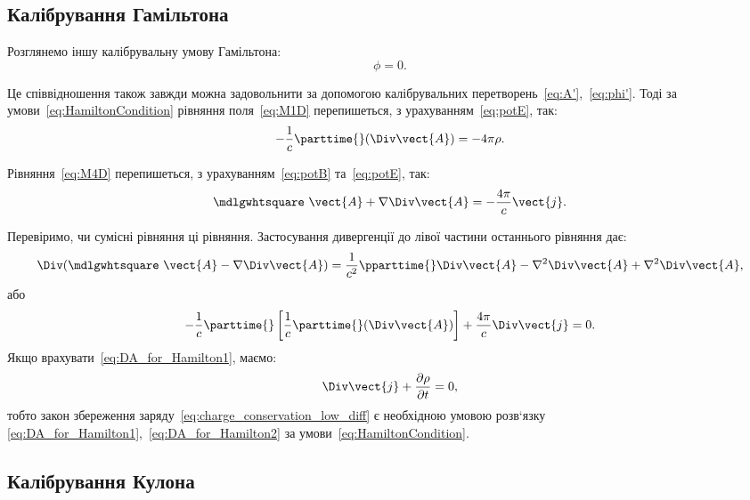 \subsection*{Калібрування Гамільтона}

Розглянемо іншу калібрувальну умову Гамільтона:
\begin{equation}\label{eq:HamiltonCondition}
	\phi = 0.
\end{equation}

Це співвідношення також завжди можна задовольнити за допомогою
калібрувальних перетворень~\eqref{eq:A'},~\eqref{eq:phi'}. Тоді за умови~\eqref{eq:HamiltonCondition} рівняння
поля~\eqref{eq:M1D} перепишеться, з урахуванням~\eqref{eq:potE}, так:
\begin{equation}
	-\frac1c \parttime{} (\Div \vect{A}) = -4\pi \rho.
\end{equation}

Рівняння~\eqref{eq:M4D} перепишеться, з урахуванням~\eqref{eq:potB} та~\eqref{eq:potE}, так:
\begin{equation}\label{eq:DA_for_Hamilton1}
	\mdlgwhtsquare\ \vect{A}  + \nabla \Div\vect{A} = -\frac{4\pi}{c} \vect{j}.
\end{equation}

Перевіримо, чи сумісні рівняння ці рівняння. Застосування
дивергенції до лівої частини останнього рівняння дає:
\begin{equation*}
	\Div(\mdlgwhtsquare\ \vect{A}  - \nabla \Div\vect{A}) = \frac1{c^2} \pparttime{} \Div\vect{A} - \nabla^2\Div\vect{A} + \nabla^2\Div\vect{A},
\end{equation*}
або
\begin{equation}\label{eq:DA_for_Hamilton2}
	-\frac1c \parttime{} \left[ \frac1c \parttime{} (\Div\vect{A})\right] + \frac{4\pi}c \Div\vect{j} = 0.
\end{equation}
Якщо врахувати~\eqref{eq:DA_for_Hamilton1}, маємо:
\begin{equation*}
	\Div \vect{j} + \frac{\partial \rho}{\partial t} = 0,
\end{equation*}
тобто закон збереження заряду~\eqref{eq:charge_conservation_low_diff} є необхідною умовою розв`язку
\eqref{eq:DA_for_Hamilton1},~\eqref{eq:DA_for_Hamilton2} за умови~\eqref{eq:HamiltonCondition}.


\subsection*{Калібрування Кулона}

